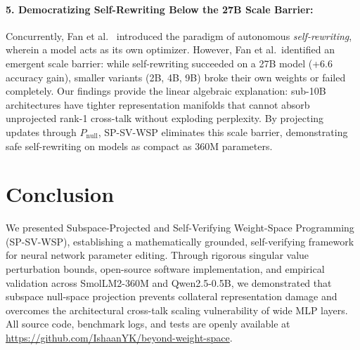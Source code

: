 \documentclass[11pt,a4paper]{article}
\begin{document}
\paragraph{5. Democratizing Self-Rewriting Below the 27B Scale Barrier:} Concurrently, Fan et al.~\cite{fan2026selfrewriting} introduced the paradigm of autonomous \emph{self-rewriting}, wherein a model acts as its own optimizer. However, Fan et al.~identified an emergent scale barrier: while self-rewriting succeeded on a 27B model (+6.6 accuracy gain), smaller variants (2B, 4B, 9B) broke their own weights or failed completely. Our findings provide the linear algebraic explanation: sub-10B architectures have tighter representation manifolds that cannot absorb unprojected rank-1 cross-talk without exploding perplexity. By projecting updates through $P_{\text{null}}$, SP-SV-WSP eliminates this scale barrier, demonstrating safe self-rewriting on models as compact as 360M parameters.

\section{Conclusion}

We presented Subspace-Projected and Self-Verifying Weight-Space Programming (SP-SV-WSP), establishing a mathematically grounded, self-verifying framework for neural network parameter editing. Through rigorous singular value perturbation bounds, open-source software implementation, and empirical validation across SmolLM2-360M and Qwen2.5-0.5B, we demonstrated that subspace null-space projection prevents collateral representation damage and overcomes the architectural cross-talk scaling vulnerability of wide MLP layers. All source code, benchmark logs, and tests are openly available at \url{https://github.com/IshaanYK/beyond-weight-space}.
\end{document}
